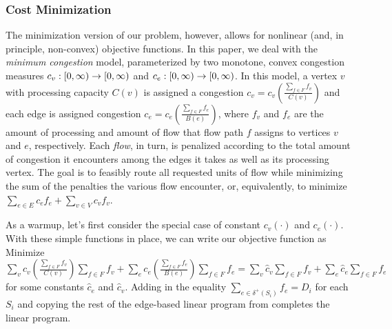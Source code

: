 
\subsubsection{Cost Minimization}
The minimization version of our problem, however, allows for nonlinear (and, in principle, non-convex) objective functions. In this paper, we deal with the \textit{minimum congestion} model, parameterized by two monotone, convex congestion measures $c_v : {{[0,\infty)}} \rightarrow {{\ensuremath{[0,\infty)}}}$ and $c_e : {{[0,\infty)}} \rightarrow {{\ensuremath{[0,\infty)}}}$. In this model, a vertex $v$ with processing capacity $C(v)$ is assigned a congestion $c_v = c_v(\frac{\sum_{f \in F} f_v}{C(v)})$ and each edge is assigned congestion $c_e  = c_e(\frac{\sum_{f \in F} f_e}{B(e)})$, where $f_v$ and $f_e$ are the amount of processing and amount of flow that flow path $f$ assigns to vertices $v$ and $e$, respectively. Each \textit{{flow}}, in turn, is penalized according to the total amount of congestion it encounters among the edges it takes as well as its processing vertex. The goal is to feasibly route all requested units of flow while minimizing the sum of the penalties the various {flow} encounter, or, equivalently, to minimize $\sum_{e \in E} c_e f_e + \sum_{v \in V} c_v f_v$. 


As a warmup, let's first consider the special case of constant $c_v(\cdot)$ and $c_e(\cdot)$. With these simple functions in place, we can write our objective function as {\sc Minimize} $\sum_v{c_v(\frac{\sum_{f \in F} f_v}{C(v)}) \sum_{f \in F} f_v} + \sum_e{c_e(\frac{\sum_{f \in F} f_e}{B(e)}) \sum_{f \in F} f_e} = \sum_v{\hat{c}_v\sum_{f \in F} f_v} + \sum_e{\hat{c}_e\sum_{f \in F} f_e}$ for some constants $\hat{c}_e$ and $\hat{c}_v$. Adding in the equality $\sum_{e \in \delta^+(S_i)} f_e = D_i$ for each $S_i$ and copying the rest of the edge-based linear program from  completes the linear program. 


